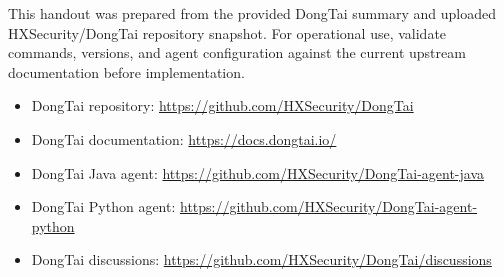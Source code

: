 \documentclass[11pt]{article}
\begin{document}
This handout was prepared from the provided DongTai summary and uploaded HXSecurity/DongTai repository snapshot. For operational use, validate commands, versions, and agent configuration against the current upstream documentation before implementation.

\begin{itemize}
  \item DongTai repository: \url{https://github.com/HXSecurity/DongTai}
  \item DongTai documentation: \url{https://docs.dongtai.io/}
  \item DongTai Java agent: \url{https://github.com/HXSecurity/DongTai-agent-java}
  \item DongTai Python agent: \url{https://github.com/HXSecurity/DongTai-agent-python}
  \item DongTai discussions: \url{https://github.com/HXSecurity/DongTai/discussions}
\end{itemize}
\end{document}
